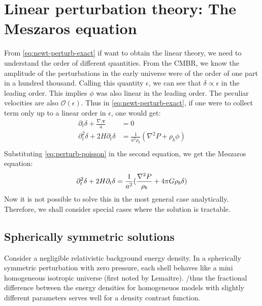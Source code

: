 \documentclass[12pt,a4paper,oneside]{book}
\def\pa{{\partial}}
\begin{document}
	\section{Linear perturbation theory: The Meszaros equation}
		From \ref{eq:newt-perturb-exact} if want to obtain the linear theory, we need to understand the order of different quantities. From the CMBR, we know the amplitude of the perturbations in the early universe were of the order of one part in a hundred thousand. Calling this quantity $\epsilon$, we can see that $\delta\propto\epsilon$ in the leading order. This implies $\phi$ was also linear in the leading order. The peculiar velocities are also $\mathcal{O}(\epsilon)$. Thus in \ref{eq:newt-perturb-exact}, if one were to collect term only up to a linear order in $\epsilon$, one would get:
		$$
		\begin{aligned}
			\partial_t\delta+\frac{\nabla.\mathbf{v}}{a}&=0\\
			\pa_t^2\delta+2H\pa_t\delta&=\frac{1}{a^2\rho_b}(\nabla^2P+\rho_b\phi)\\
		\end{aligned}
		$$
		Substituting \ref{eq:perturb-poisson} in the second equation, we get the Meszaros equation:
		\begin{equation}
			\pa_t^2\delta+2H\pa_t\delta=\frac{1}{a^2}(\frac{\nabla^2P}{\rho_b}+4\pi G\rho_b\delta)\\
			\label{eq:meszaros}
		\end{equation}
		Now it is not possible to solve this in the most general case analytically. Therefore, we shall consider special cases where the solution is tractable.
		\subsection{Spherically symmetric solutions}
			Consider a negligible relativistic background energy density. In a spherically symmetric perturbation with zero pressure, each shell behaves like a mini homogeneous isotropic universe (first noted by Lemaitre). /thus the fractional difference between the energy densities for homogeneuos models with slightly different parameters serves well for a density contrast function.
			
\end{document}

